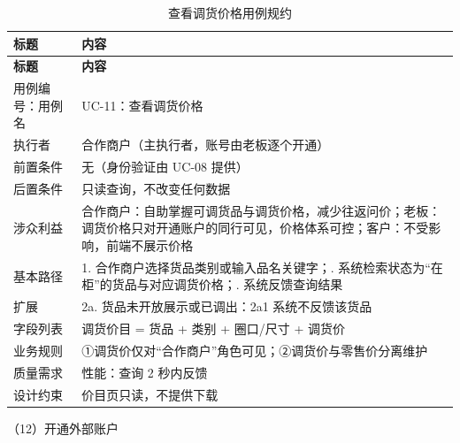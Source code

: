 \documentclass[12pt, a4paper]{ctexart}
\begin{document}
{\small
\begin{longtable}{@{}p{2.4cm} p{12.9cm}@{}}
\caption{查看调货价格用例规约}\label{tab:uc-11}\\
\toprule
\textbf{标题} & \textbf{内容} \\
\midrule
\endfirsthead
\toprule
\textbf{标题} & \textbf{内容} \\
\midrule
\endhead
用例编号：用例名 & UC-11：查看调货价格 \\
\midrule
执行者 & 合作商户（主执行者，账号由老板逐个开通） \\
\midrule
前置条件 & 无（身份验证由 UC-08 提供） \\
\midrule
后置条件 & 只读查询，不改变任何数据 \\
\midrule
涉众利益 & 合作商户：自助掌握可调货品与调货价格，减少往返问价；\newline 老板：调货价格只对开通账户的同行可见，价格体系可控；\newline 客户：不受影响，前端不展示价格 \\
\midrule
基本路径 & 1. 合作商户选择货品类别或输入品名关键字；\newline 2. 系统检索状态为“在柜”的货品与对应调货价格；\newline 3. 系统反馈查询结果 \\
\midrule
扩展 & 2a. 货品未开放展示或已调出：2a1 系统不反馈该货品 \\
\midrule
字段列表 & 调货价目 = 货品 + 类别 + 圈口/尺寸 + 调货价 \\
\midrule
业务规则 & ①调货价仅对“合作商户”角色可见；\newline ②调货价与零售价分离维护 \\
\midrule
质量需求 & 性能：查询 2 秒内反馈 \\
\midrule
设计约束 & 价目页只读，不提供下载 \\
\midrule
\bottomrule
\end{longtable}}
\noindent（12）开通外部账户
\end{document}
